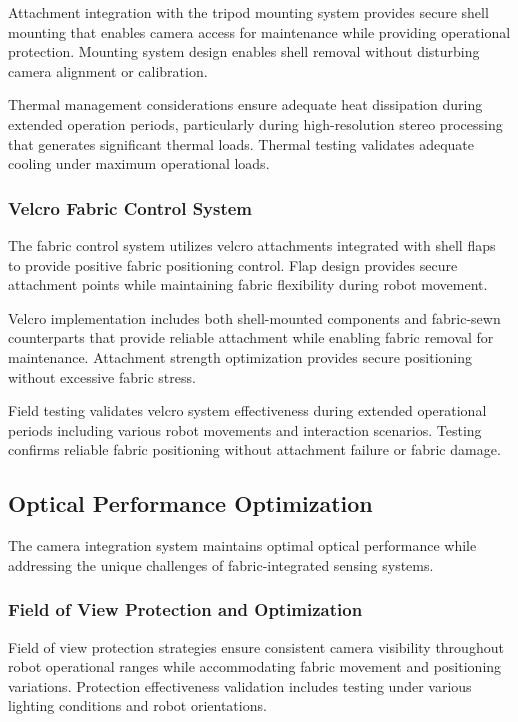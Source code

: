 Attachment integration with the tripod mounting system provides secure shell mounting that enables camera access for maintenance while providing operational protection. Mounting system design enables shell removal without disturbing camera alignment or calibration.

Thermal management considerations ensure adequate heat dissipation during extended operation periods, particularly during high-resolution stereo processing that generates significant thermal loads. Thermal testing validates adequate cooling under maximum operational loads.

\subsubsection{Velcro Fabric Control System}

The fabric control system utilizes velcro attachments integrated with shell flaps to provide positive fabric positioning control. Flap design provides secure attachment points while maintaining fabric flexibility during robot movement.

Velcro implementation includes both shell-mounted components and fabric-sewn counterparts that provide reliable attachment while enabling fabric removal for maintenance. Attachment strength optimization provides secure positioning without excessive fabric stress.

Field testing validates velcro system effectiveness during extended operational periods including various robot movements and interaction scenarios. Testing confirms reliable fabric positioning without attachment failure or fabric damage.

\subsection{Optical Performance Optimization}

The camera integration system maintains optimal optical performance while addressing the unique challenges of fabric-integrated sensing systems.

\subsubsection{Field of View Protection and Optimization}

Field of view protection strategies ensure consistent camera visibility throughout robot operational ranges while accommodating fabric movement and positioning variations. Protection effectiveness validation includes testing under various lighting conditions and robot orientations.

